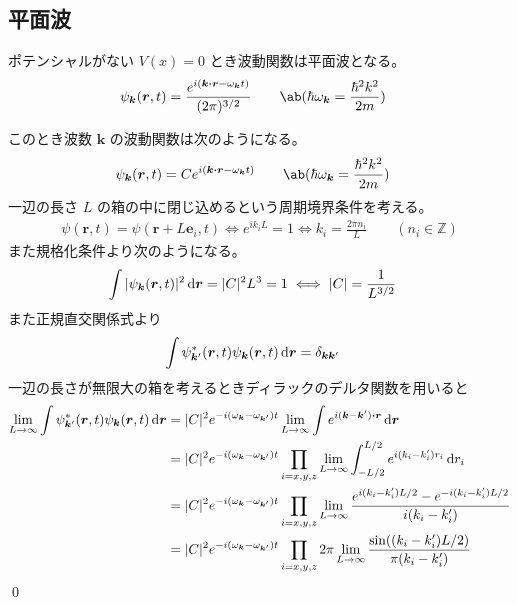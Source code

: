 \documentclass[uplatex,dvipdfmx,a4paper,11pt]{jlreq}
\makeatletter
\newcommand{\ZZ}{\mathbb{Z}}
\newcommand{\rr}{\bm{r}}
\newcommand{\kk}{\bm{k}}
\numberwithin{equation}{section}
\theoremstyle{definition}
\renewenvironment{proof}[1][\proofname]{\par
  \normalfont
  \topsep6\p@\@plus6\p@ \trivlist
  \item[\hskip\labelsep{\bfseries #1}\@addpunct{\bfseries}]\ignorespaces\quad\par
}{%
  \qed\endtrivlist\@endpefalse
}
\renewcommand\proofname{証明}
\makeatother
\begin{document}
\subsection{平面波}
\begin{proposition}
  ポテンシャルがない $V(x) = 0$ とき波動関数は平面波となる。
  \begin{align}
    \psi_{\kk}(\rr, t) & = \frac{e^{i(\kk\vdot\rr - \omega_{\kk}t)}}{(2\pi)^{3/2}} \qquad \ab(\hbar\omega_{\kk} = \frac{\hbar^2k^2}{2m})
  \end{align}
\end{proposition}
\begin{proof}
  このとき波数 $\kk$ の波動関数は次のようになる。
  \begin{align}
    \psi_{\kk}(\rr, t) & = Ce^{i(\kk\vdot\rr - \omega_{\kk}t)} \qquad \ab(\hbar\omega_{\kk} = \frac{\hbar^2k^2}{2m})
  \end{align}
  一辺の長さ $L$ の箱の中に閉じ込めるという周期境界条件を考える。
  \begin{align}
    \psi(\rr, t) = \psi(\rr + L\bm{e}_i, t) \iff e^{ik_iL} = 1 \iff k_i = \frac{2\pi n_i}{L} \qquad (n_i\in\ZZ)
  \end{align}
  また規格化条件より次のようになる。
  \begin{align}
    \int|\psi_{\kk}(\rr, t)|^2\dl{\rr} = |C|^2L^3 = 1 \iff |C| & = \frac{1}{L^{3/2}}
  \end{align}
  また正規直交関係式より
  \begin{align}
    \int\psi_{\kk'}^*(\rr, t)\psi_{\kk}(\rr, t)\dl{\rr} & = \delta_{\kk\kk'}
  \end{align}
  一辺の長さが無限大の箱を考えるときディラックのデルタ関数を用いると
  \begin{align}
    \lim_{L\to\infty}\int\psi_{\kk'}^*(\rr, t)\psi_{\kk}(\rr, t)\dl{\rr} & = |C|^2e^{-i(\omega_{\kk} - \omega_{\kk'})t}\lim_{L\to\infty}\int e^{i(\kk - \kk')\vdot\rr}\dl{\rr}                                            \\
                                                                         & = |C|^2e^{-i(\omega_{\kk} - \omega_{\kk'})t}\prod_{i=x,y,z}\lim_{L\to\infty}\int_{-L/2}^{L/2} e^{i(k_i - k_i')r_i}\dl{r_i}                     \\
                                                                         & = |C|^2e^{-i(\omega_{\kk} - \omega_{\kk'})t}\prod_{i=x,y,z}\lim_{L\to\infty}\frac{e^{i(k_i - k_i')L/2} - e^{-i(k_i - k_i')L/2}}{i(k_i - k_i')} \\
                                                                         & = |C|^2e^{-i(\omega_{\kk} - \omega_{\kk'})t}\prod_{i=x,y,z}2\pi\lim_{L\to\infty}\frac{\sin((k_i - k_i')L/2)}{\pi(k_i - k_i')}                  \\

\end{align}
\end{proof}
\end{document}
